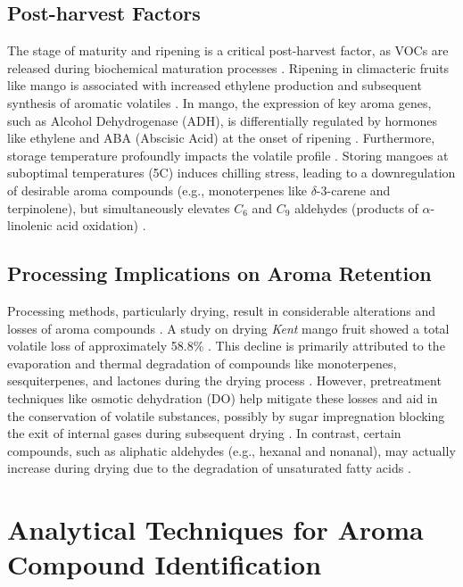 \subsection{Post-harvest Factors}
The stage of maturity and ripening is a critical post-harvest factor, as VOCs are released during biochemical maturation processes \cite*{A01_Aguirre-Lopez_2023,A13_ElHadi2013}. Ripening in climacteric fruits like mango is associated with increased ethylene production and subsequent synthesis of aromatic volatiles \cite*{A05_Chin2019}. In mango, the expression of key aroma genes, such as Alcohol Dehydrogenase (ADH), is differentially regulated by hormones like ethylene and ABA (Abscisic Acid) at the onset of ripening \cite*{A10_Singh2010}. Furthermore, storage temperature profoundly impacts the volatile profile \cite*{A13_ElHadi2013}. Storing mangoes at suboptimal temperatures (5\textdegree C) induces chilling stress, leading to a downregulation of desirable aroma compounds (e.g., monoterpenes like $\delta$-3-carene and terpinolene), but simultaneously elevates $C_6$ and $C_9$ aldehydes (products of $\alpha$-linolenic acid oxidation) \cite*{A11_Sivankalyani2017}.


\subsection{Processing Implications on Aroma Retention}
Processing methods, particularly drying, result in considerable alterations and losses of aroma compounds \cite*{A07_Bonneau2016}. A study on drying \textit{Kent} mango fruit showed a total volatile loss of approximately 58.8\% \cite*{A07_Bonneau2016,A16_Tandel2023}. This decline is primarily attributed to the evaporation and thermal degradation of compounds like monoterpenes, sesquiterpenes, and lactones during the drying process \cite*{A07_Bonneau2016}. However, pretreatment techniques like osmotic dehydration (DO) help mitigate these losses and aid in the conservation of volatile substances, possibly by sugar impregnation blocking the exit of internal gases during subsequent drying \cite*{A02_Moreno2010}. In contrast, certain compounds, such as aliphatic aldehydes (e.g., hexanal and nonanal), may actually increase during drying due to the degradation of unsaturated fatty acids \cite*{A07_Bonneau2016}.

\section{Analytical Techniques for Aroma Compound Identification}
